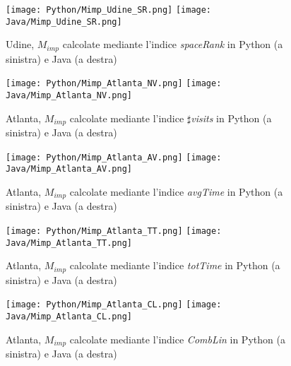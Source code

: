 \begin{figure}[h]
    \begin{center}
    \texttt{[image: Python/Mimp\_Udine\_SR.png]}
    \texttt{[image: Java/Mimp\_Udine\_SR.png]}
    \caption[UD_SR]{
        Udine, $M_{imp}$ calcolate mediante l'indice \textit{spaceRank}
        in Python (a sinistra) e Java (a destra)
    }
    \label{etichetta}
    \end{center}
\end{figure}

\begin{figure}[h]
    \begin{center}
    \texttt{[image: Python/Mimp\_Atlanta\_NV.png]}
    \texttt{[image: Java/Mimp\_Atlanta\_NV.png]}
    \caption[AT_NV]{
        Atlanta, $M_{imp}$ calcolate mediante l'indice $\sharp$\textit{visits}
        in Python (a sinistra) e Java (a destra)
    }
    \label{etichetta}
    \end{center}
\end{figure}

\begin{figure}[h]
    \begin{center}
    \texttt{[image: Python/Mimp\_Atlanta\_AV.png]}
    \texttt{[image: Java/Mimp\_Atlanta\_AV.png]}
    \caption[AT_AV]{
        Atlanta, $M_{imp}$ calcolate mediante l'indice \textit{avgTime}
        in Python (a sinistra) e Java (a destra)
    }
    \label{etichetta}
    \end{center}
\end{figure}

\begin{figure}[h]
    \begin{center}
    \texttt{[image: Python/Mimp\_Atlanta\_TT.png]}
    \texttt{[image: Java/Mimp\_Atlanta\_TT.png]}
    \caption[AT_TT]{
        Atlanta, $M_{imp}$ calcolate mediante l'indice \textit{totTime}
        in Python (a sinistra) e Java (a destra)
    }
    \label{etichetta}
    \end{center}
\end{figure}

\begin{figure}[h]
    \begin{center}
    \texttt{[image: Python/Mimp\_Atlanta\_CL.png]}
    \texttt{[image: Java/Mimp\_Atlanta\_CL.png]}
    \caption[AT_CL]{
        Atlanta, $M_{imp}$ calcolate mediante l'indice \textit{CombLin}
        in Python (a sinistra) e Java (a destra)
    }
    \label{etichetta}
    \end{center}
\end{figure}

